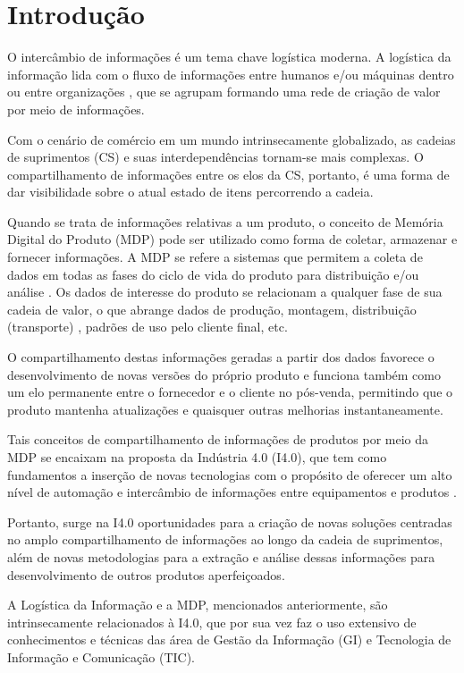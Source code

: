 \chapter{Introdução}
\label{cha:introducao}

O intercâmbio de informações é um tema chave logística moderna. A logística da informação lida com o fluxo de informações entre humanos e/ou máquinas dentro ou entre organizações \cite{haftor2011information}, que se agrupam formando uma rede de criação de valor por meio de informações.

Com o cenário de comércio em um mundo intrinsecamente globalizado, as cadeias de suprimentos (CS) e suas interdependências tornam-se mais complexas. O compartilhamento de informações entre os elos da CS, portanto, é uma forma de dar visibilidade sobre o atual estado de itens percorrendo a cadeia.

Quando se trata de informações relativas a um produto, o conceito de Memória Digital do Produto (MDP) pode ser utilizado como forma de coletar, armazenar e fornecer informações. A MDP se refere a sistemas que permitem a coleta de dados em todas as fases do ciclo de vida do produto para distribuição e/ou análise \cite{wahlster2007digitalmemory}. Os dados de interesse do produto se relacionam a qualquer fase de sua cadeia de valor, o que abrange dados de produção, montagem, distribuição (transporte) \cite{brandherm2011productmemory}, padrões de uso pelo cliente final, etc.

O compartilhamento destas informações geradas a partir dos dados favorece o desenvolvimento de novas versões do próprio produto e funciona também como um elo permanente entre o fornecedor e o cliente no pós-venda, permitindo que o produto mantenha atualizações e quaisquer outras melhorias instantaneamente.

Tais conceitos de compartilhamento de informações de produtos por meio da MDP se encaixam na proposta da Indústria 4.0 (I4.0), que tem como fundamentos a inserção de novas tecnologias com o propósito de oferecer um alto nível de automação e intercâmbio de informações entre equipamentos e produtos \cite{lasi2014industryfour}.

Portanto, surge na I4.0 oportunidades para a criação de novas soluções centradas no amplo compartilhamento de informações ao longo da cadeia de suprimentos, além de novas metodologias para a extração e análise dessas informações para desenvolvimento de outros produtos aperfeiçoados.

A Logística da Informação e a MDP, mencionados anteriormente, são intrinsecamente relacionados à I4.0, que por sua vez faz o uso extensivo de conhecimentos e técnicas das área de Gestão da Informação (GI) e Tecnologia de Informação e Comunicação (TIC).

